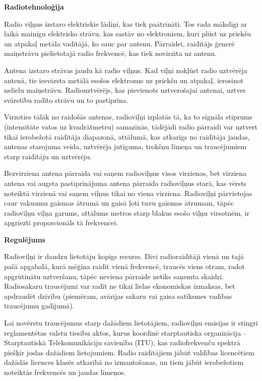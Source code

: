 \documentclass[a4paper, twoside, 12pt]{book}
\begin{document}
\vspace{6pt}
{\noindent \textbf{Radiotehnoloģija}}
\vspace{6pt}

Radio viļņus izstaro elektriskie lādiņi, kas tiek paātrināti. Tos rada mākslīgi ar laikā mainīgu elektrisko strāvu, kas sastāv no elektroniem, kuri plūst uz priekšu un atpakaļ metāla vadītājā, ko sauc par antenu. Pārraidei, raidītājs ģenerē maiņstrāvu pielietotajā radio frekvencē, kas tiek novirzīta uz antenu.

Antena izstaro strāvas jaudu kā radio viļņus. Kad viļņi nokļūst radio uztvērēja antenā, tie iesvārsta metālā esošos elektronus uz priekšu un atpakaļ, ierosinot nelielu maiņstrāvu. Radiouztvērējs, kas pievienots uztverošajai antenai, uztver svārstību radīto strāvu un to pastiprina.

Virzoties tālāk no raidošās antenas, radioviļņi izplatās tā, ka to signāla stiprums (intensitāte vatos uz kvadrātmetru) samazinās, tādējādi radio pārraidi var uztvert tikai ierobežotā raidītāja diapazonā, attālumā, kas atkarīgs no raidītāja jaudas, antenas starojuma veida, uztvērēja jutīguma, trokšņu līmeņa un traucējumiem starp raidītāju un uztvērēju.

Bezvirziena antena pārraida vai saņem radioviļņus visos virzienos, bet virziena antena vai augsta pastiprinājuma antena pārraida radioviļņus starā, kas vērsts noteiktā virzienā vai saņem viļņus tikai no viena virziena. Radioviļņi pārvietojas caur vakuumu gaismas ātrumā un gaisā ļoti tuvu gaismas ātrumam, tāpēc radioviļņu viļņa garums, attālums metros starp blakus esošo viļņu virsotnēm, ir apgriezti proporcionāls tā frekvencei.

\vspace{6pt}
{\noindent \textbf{Regulējums}}
\vspace{6pt}

Radioviļņi ir daudzu lietotāju kopīgs resurss. Divi radioraidītāji vienā un tajā pašā apgabalā, kurā mēģina raidīt vienā frekvencē, traucēs viens otram, radot apgrūtinātu uztveršanu, tāpēc neviena pārraide netiks saņemta skaidri. Radiosakaru traucējumi var radīt ne tikai lielas ekonomiskas izmaksas, bet apdraudēt dzīvību (piemēram, avārijas sakaru vai gaisa satiksmes vadības traucējumu gadījumā).

Lai novērstu traucējumus starp dažādiem lietotājiem, radioviļņu emisijas ir stingri reglamentētas valstu tiesību aktos, kurus koordinē starptautiska organizācija – Starptautiskā Telekomunikāciju savienība (ITU), kas radiofrekvenču spektrā piešķir joslas dažādiem lietojumiem. Radio raidītājiem jābūt valdības licencētiem dažādās licences klasēs atkarībā no izmantošanas, un tiem jābūt ierobežotiem noteiktās frekvencēs un jaudas līmeņos.
\end{document}
